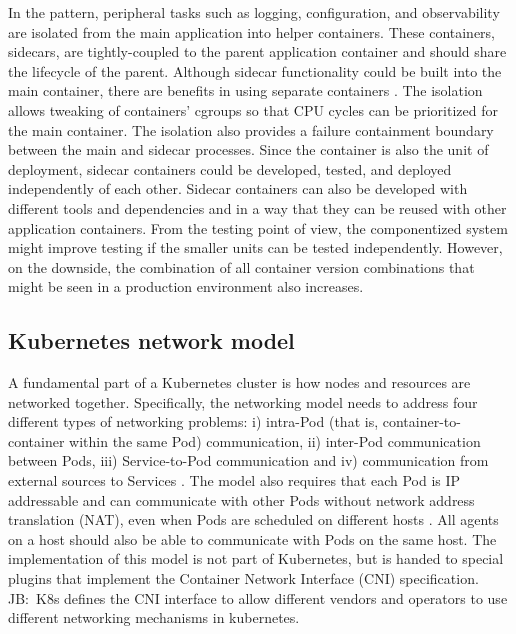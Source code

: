 \documentclass[english, 12pt, a4paper, sci, utf8, a-2b, online]{aaltothesis}
\newcommand{\mycomment}[3]{\textcolor{#1}{#2:~#3}}
\newcommand{\jb}[1]{\noindent\mycomment{aaltoRed}{JB}{#1}}
\begin{document}
In the pattern, peripheral tasks such as logging, configuration, and observability are isolated from the main application into helper containers.
These containers, sidecars, are tightly-coupled to the parent application container and should share the lifecycle of the parent.
Although sidecar functionality could be built into the main container, there are benefits in using separate containers \cite{burns2016design}.
The isolation allows tweaking of containers' cgroups so that CPU cycles can be prioritized for the main container.
The isolation also provides a failure containment boundary between the main and sidecar processes.
Since the container is also the unit of deployment, sidecar containers could be developed, tested, and deployed independently of each other.
Sidecar containers can also be developed with different tools and dependencies and in a way that they can be reused with other application containers.
From the testing point of view, the componentized system might improve testing if the smaller units can be tested independently.
However, on the downside, the combination of all container version combinations that might be seen in a production environment also increases.

\subsection{Kubernetes network model}



A fundamental part of a Kubernetes cluster is how nodes and resources are networked together.
Specifically, the networking model needs to address four different types of networking problems: i) intra-Pod (that is, container-to-container within the same Pod) communication, ii) inter-Pod communication between Pods, iii) Service-to-Pod communication and iv) communication from external sources to Services \cite{k8s-docs-cluster-networking}.
The model also requires that each Pod is IP addressable and can communicate with other Pods without network address translation (NAT), even when Pods are scheduled on different hosts \cite{qi2020assessing}.
All agents on a host should also be able to communicate with Pods on the same host.
The implementation of this model is not part of Kubernetes, but is handed to special plugins that implement the Container Network Interface (CNI) specification.
\jb{K8s defines the CNI interface to allow different vendors and operators to use different networking mechanisms in kubernetes.}
\end{document}
